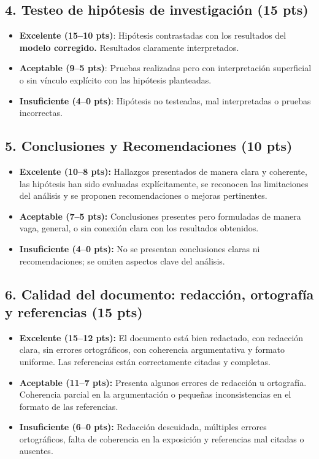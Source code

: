 \documentclass{article}
\begin{document}
\subsection*{4. Testeo de hip\'otesis de investigaci\'on (15 pts)}
    \begin{itemize}
      \item \textbf{Excelente (15--10 pts)}: Hip\'otesis contrastadas con los resultados del {\bf modelo corregido.} Resultados claramente interpretados.
      \item \textbf{Aceptable (9--5 pts)}: Pruebas realizadas pero con interpretaci\'on superficial o sin v\'inculo expl\'icito con las hip\'otesis planteadas.
      \item \textbf{Insuficiente (4--0 pts)}: Hip\'otesis no testeadas, mal interpretadas o pruebas incorrectas.
    \end{itemize}


\subsection*{5. Conclusiones y Recomendaciones (10 pts)}

\begin{itemize}
  \item \textbf{Excelente (10--8 pts):} Hallazgos presentados de manera clara y coherente, las hipótesis han sido evaluadas explícitamente, se reconocen las limitaciones del análisis y se proponen recomendaciones o mejoras pertinentes.
  \item \textbf{Aceptable (7--5 pts):} Conclusiones presentes pero formuladas de manera vaga, general, o sin conexión clara con los resultados obtenidos.
  \item \textbf{Insuficiente (4--0 pts):} No se presentan conclusiones claras ni recomendaciones; se omiten aspectos clave del análisis.
\end{itemize}

\subsection*{6. Calidad del documento: redacción, ortografía y referencias (15 pts)}

\begin{itemize}
  \item \textbf{Excelente (15--12 pts):} El documento está bien redactado, con redacción clara, sin errores ortográficos, con coherencia argumentativa y formato uniforme. Las referencias están correctamente citadas y completas.
  \item \textbf{Aceptable (11--7 pts):} Presenta algunos errores de redacción u ortografía. Coherencia parcial en la argumentación o pequeñas inconsistencias en el formato de las referencias.
  \item \textbf{Insuficiente (6--0 pts):} Redacción descuidada, múltiples errores ortográficos, falta de coherencia en la exposición y referencias mal citadas o ausentes.
\end{itemize}
\end{document}
